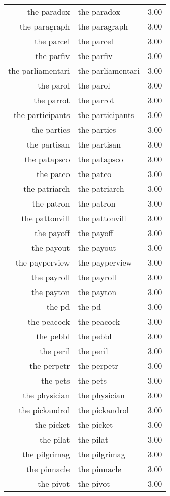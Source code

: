 \begin{table}[ht]
\begin{tabular}{rlr}
  the paradox & the paradox & 3.00 \\ 
  the paragraph & the paragraph & 3.00 \\ 
  the parcel & the parcel & 3.00 \\ 
  the parfiv & the parfiv & 3.00 \\ 
  the parliamentari & the parliamentari & 3.00 \\ 
  the parol & the parol & 3.00 \\ 
  the parrot & the parrot & 3.00 \\ 
  the participants & the participants & 3.00 \\ 
  the parties & the parties & 3.00 \\ 
  the partisan & the partisan & 3.00 \\ 
  the patapsco & the patapsco & 3.00 \\ 
  the patco & the patco & 3.00 \\ 
  the patriarch & the patriarch & 3.00 \\ 
  the patron & the patron & 3.00 \\ 
  the pattonvill & the pattonvill & 3.00 \\ 
  the payoff & the payoff & 3.00 \\ 
  the payout & the payout & 3.00 \\ 
  the payperview & the payperview & 3.00 \\ 
  the payroll & the payroll & 3.00 \\ 
  the payton & the payton & 3.00 \\ 
  the pd & the pd & 3.00 \\ 
  the peacock & the peacock & 3.00 \\ 
  the pebbl & the pebbl & 3.00 \\ 
  the peril & the peril & 3.00 \\ 
  the perpetr & the perpetr & 3.00 \\ 
  the pets & the pets & 3.00 \\ 
  the physician & the physician & 3.00 \\ 
  the pickandrol & the pickandrol & 3.00 \\ 
  the picket & the picket & 3.00 \\ 
  the pilat & the pilat & 3.00 \\ 
  the pilgrimag & the pilgrimag & 3.00 \\ 
  the pinnacle & the pinnacle & 3.00 \\ 
  the pivot & the pivot & 3.00 \\ 

\end{tabular}
\end{table}
